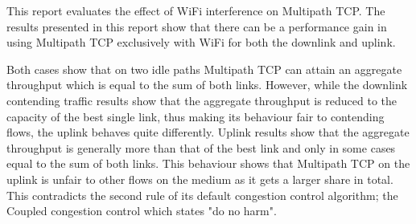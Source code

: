 This report evaluates the effect of WiFi interference on Multipath TCP. 
The results presented in this report show that there can be a performance gain 
in using Multipath TCP exclusively with WiFi for both the downlink and uplink.

Both cases show that on two idle paths Multipath TCP can attain an aggregate
throughput which is equal to the sum of both links. 
However, while the downlink contending traffic results show that the aggregate 
throughput is reduced to the capacity of the best single link, thus making its 
behaviour fair to contending flows, the uplink behaves quite differently.
Uplink results show that the aggregate throughput is generally more than that of 
the best link and only in some cases equal to the sum of both links. This 
behaviour shows that Multipath TCP on the uplink is unfair to other flows on the 
medium as it gets a larger share in total. This contradicts the second rule of 
its default congestion control algorithm; the Coupled congestion control which 
states "do no harm". 
